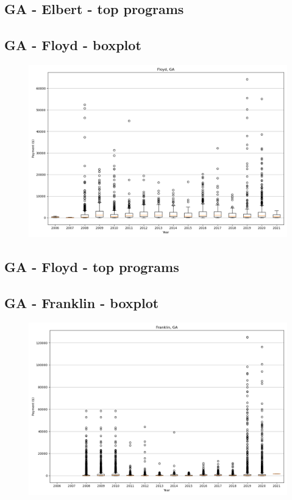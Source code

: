 \subsection*{GA - Elbert - top programs}

\newpage
\subsection*{GA - Floyd - boxplot}
\begin{figure}[h]
\centering
\includegraphics[width=7in]{../output/boxplots/counties/Floyd-GA_boxplot.png}
\end{figure}


\subsection*{GA - Floyd - top programs}

\newpage
\subsection*{GA - Franklin - boxplot}
\begin{figure}[h]
\centering
\includegraphics[width=7in]{../output/boxplots/counties/Franklin-GA_boxplot.png}
\end{figure}


